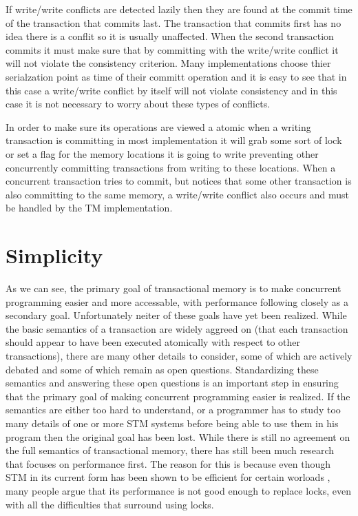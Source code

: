 If write/write conflicts are detected lazily then they are found at the 
commit time of the transaction that commits last.
The transaction that commits first has no idea there is a conflit so 
it is usually unaffected.
When the second transaction commits it must make sure that by committing 
with the write/write conflict it will not violate the consistency criterion.
Many implementations choose thier serialzation point as time of their 
committ operation and it is easy to see that in this case a write/write 
conflict by itself will not violate consistency and in this case it is not
 necessary to worry about these types of conflicts.

In order to make sure its operations are viewed a atomic when a writing transaction
 is committing in most implementation it will grab some sort of lock or set a flag
 for the memory locations it is going to write preventing other concurrently committing
 transactions from writing to these locations.
When a concurrent transaction tries to commit, but notices that some other
 transaction is also committing to the same memory, a write/write conflict 
also occurs and must be handled by the TM implementation.
























\section{Simplicity}
As we can see, the primary goal of transactional memory is to make concurrent programming
easier and more accessable, with performance following closely as a secondary goal.
Unfortunately neiter of these goals have yet been realized.
While the basic semantics of a transaction are widely aggreed on
(that each transaction should appear to have been executed atomically
with respect to other transactions), there are many other details to consider,
some of which are actively debated and some of which remain as open questions.
Standardizing these semantics and answering these open questions is an important
step in ensuring that the primary goal of making concurrent programming easier
is realized.
If the semantics are either too hard to understand, or a programmer has to study
too many details of one or more STM systems before being able to use them in
his program then the original goal has been lost.
While there is still no agreement on the full semantics of transactional memory,
there has still been much research that focuses on performance first.
The reason for this is because even though STM in its current form has been shown
to be efficient for certain worloads \cite{}, many people argue that
its performance is not good enough to replace locks, even with all the
difficulties that surround using locks.

